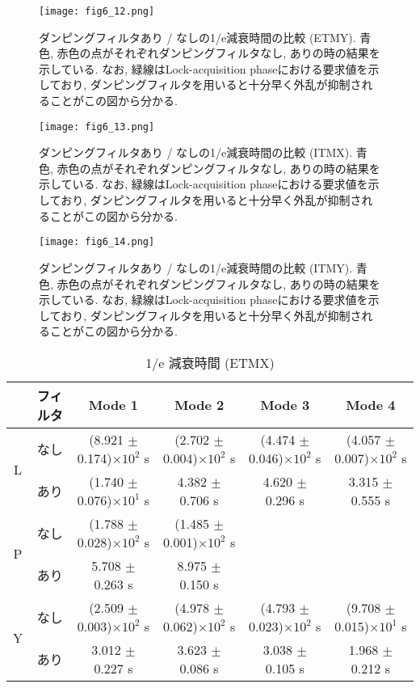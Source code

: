 \begin{figure}[H]
\begin{center}
\texttt{[image: fig6\_12.png]}
\caption[1/e減衰時間 (ETMY)]{ダンピングフィルタあり / なしの1/e減衰時間の比較 (ETMY). 青色, 赤色の点がそれぞれダンピングフィルタなし, ありの時の結果を示している. なお, 緑線はLock-acquisition phaseにおける要求値を示しており, ダンピングフィルタを用いると十分早く外乱が抑制されることがこの図から分かる. }
\label{fig6.12}
\end{center}
\end{figure}
\begin{figure}[H]
\begin{center}
\texttt{[image: fig6\_13.png]}
\caption[1/e減衰時間 (ITMX)]{ダンピングフィルタあり / なしの1/e減衰時間の比較 (ITMX). 青色, 赤色の点がそれぞれダンピングフィルタなし, ありの時の結果を示している. なお, 緑線はLock-acquisition phaseにおける要求値を示しており, ダンピングフィルタを用いると十分早く外乱が抑制されることがこの図から分かる. }
\label{fig6.13}
\end{center}
\end{figure}
\begin{figure}[H]
\begin{center}
\texttt{[image: fig6\_14.png]}
\caption[1/e減衰時間 (ITMY)]{ダンピングフィルタあり / なしの1/e減衰時間の比較 (ITMY). 青色, 赤色の点がそれぞれダンピングフィルタなし, ありの時の結果を示している. なお, 緑線はLock-acquisition phaseにおける要求値を示しており, ダンピングフィルタを用いると十分早く外乱が抑制されることがこの図から分かる. }
\label{fig6.14}
\end{center}
\end{figure}
\begin{table}[H]
 \centering
  \begin{tabular}{|c||c|c|c|c|c|}
   \hline
    & フィルタ & Mode 1 & Mode 2 & Mode 3 & Mode 4 \\
   \hline
   \multirow{2}{*}{L} & なし &(8.921 $\pm$ 0.174)$\times10^2$ s & (2.702 $\pm$ 0.004)$\times10^2$ s & (4.474 $\pm$ 0.046)$\times10^2$ s & (4.057 $\pm$ 0.007)$\times10^2$ s \\
   \cline{2-6}
      & あり &(1.740 $\pm$ 0.076)$\times10^1$ s & 4.382 $\pm$ 0.706 s & 4.620 $\pm$ 0.296 s & 3.315 $\pm$ 0.555  s \\
   \hline\hline
   \multirow{2}{*}{P} & なし &(1.788 $\pm$ 0.028)$\times10^2$ s & (1.485 $\pm$ 0.001)$\times10^2$ s &  & \\
   \cline{2-6}
      & あり & 5.708 $\pm$ 0.263 s & 8.975 $\pm$ 0.150 s & & \\
   \hline\hline
   \multirow{2}{*}{Y} & なし &(2.509 $\pm$ 0.003)$\times10^2$ s & (4.978 $\pm$ 0.062)$\times10^2$ s & (4.793 $\pm$ 0.023)$\times10^2$ s & (9.708 $\pm$ 0.015)$\times10^1$ s \\
   \cline{2-6}
      & あり & 3.012 $\pm$ 0.227 s & 3.623 $\pm$ 0.086 s & 3.038 $\pm$ 0.105 s & 1.968 $\pm$ 0.212 s \\
   \hline
  \end{tabular}
 \caption[1/e 減衰時間 (ETMX)]{1/e 減衰時間 (ETMX)}
 \label{table6.5}
\end{table}
